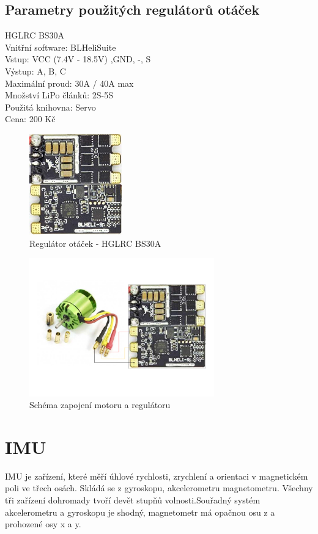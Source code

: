 \subsection{Parametry použitých regulátorů otáček}
HGLRC BS30A\\
Vnitřní software: BLHeliSuite\\
Vstup: VCC (7.4V - 18.5V) ,GND, -, S\\
Výstup: A, B, C\\
Maximální proud: 30A / 40A max\\
Množství LiPo článků: 2S-5S\\
Použitá knihovna: Servo\\
Cena: 200 Kč\\

\begin{figure}[h]
	\centering
	\includegraphics[width=4cm]{pictures/esc.jpg}
	\caption{Regulátor otáček - HGLRC BS30A}
\end{figure}

\begin{figure}[h]
	\centering
	\includegraphics[width=8cm]{pictures/motor.pdf}
	\caption{Schéma zapojení motoru a regulátoru}
\end{figure}

\section{IMU}
IMU je zařízení, které měří úhlové rychlosti, zrychlení a orientaci v magnetickém poli ve třech osách. Skládá se z gyroskopu, akcelerometru  magnetometru. Všechny tři zařízení dohromady tvoří devět stupňů volnosti.Souřadný systém akcelerometru a gyroskopu je shodný, magnetometr má opačnou osu z a prohozené osy x a y.\\

